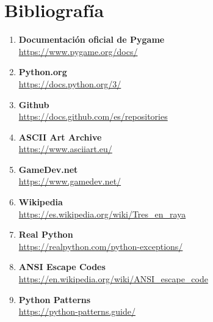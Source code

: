 \documentclass[a4paper,12pt]{article}
\begin{document}
\section{Bibliografía}
\begin{enumerate}
    \item \textbf{Documentación oficial de Pygame} \\
    \url{https://www.pygame.org/docs/}

    \item \textbf{Python.org} \\
    \url{https://docs.python.org/3/}

    \item \textbf{Github} \\
    \url{https://docs.github.com/es/repositories}

    \item \textbf{ASCII Art Archive} \\
    \url{https://www.asciiart.eu/}

    \item \textbf{GameDev.net} \\
    \url{https://www.gamedev.net/}

    \item \textbf{Wikipedia} \\
    \url{https://es.wikipedia.org/wiki/Tres_en_raya}

    \item \textbf{Real Python} \\
    \url{https://realpython.com/python-exceptions/}

    \item \textbf{ANSI Escape Codes} \\
    \url{https://en.wikipedia.org/wiki/ANSI_escape_code}

    \item \textbf{Python Patterns} \\
    \url{https://python-patterns.guide/}
\end{enumerate}
\end{document}
